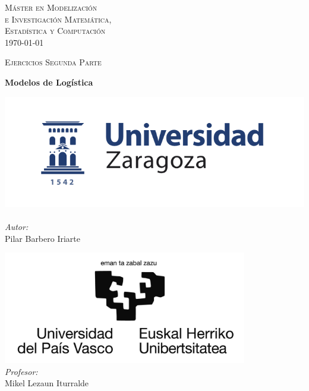\documentclass[a4paper,12pt]{article}
\author{Pilar Barbero Iriarte}
\begin{document}
\begin{titlepage}
\begin{center}



\textsc{\LARGE M\'aster en Modelizaci\'on \\e Investigaci\'on Matem\'atica,\\ Estad\'istica y Computaci\'on }\\[1.5cm]
{\large \today}

\textsc{Ejercicios Segunda Parte}\\[0.5cm]

\vfill

{ \huge \bfseries Modelos de Log\'istica \\[0.4cm] }

\vfill



\noindent
\begin{minipage}{0.4\textwidth}
\begin{flushleft} \large
\includegraphics[width=1.1\textwidth]{../logoUZ.png}~\\[1cm]
\emph{Autor:}\\
Pilar Barbero Iriarte 
\end{flushleft}
\end{minipage}%
\begin{minipage}{0.4\textwidth}
\begin{flushright} \large
\includegraphics[width=0.8\textwidth]{../logoUPV.png}~\\[1cm]
\emph{Profesor:} \\
Mikel Lezaun Iturralde 
\end{flushright}
\end{minipage}

\end{center}


\end{titlepage}
\end{document}
